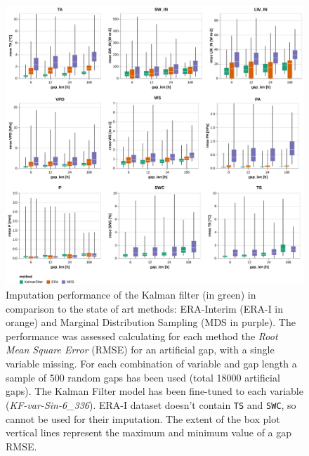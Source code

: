 \documentclass{article}
\newcommand{\imgwidth}{6in}
\begin{document}
\begin{figure}
    \centerline{\includegraphics[width=\imgwidth]{images2/the_plot}}
\caption{ Imputation performance of the Kalman filter (in green) in comparison to the state of art methods: ERA-Interim (ERA-I in orange) and Marginal Distribution Sampling (MDS in purple). The performance was assessed calculating for each method the \textit{Root Mean Square Error} (RMSE) for an artificial gap, with a single variable missing. For each combination of variable and gap length a sample of 500 random gaps has been used (total 18000 artificial gaps).
The Kalman Filter model has been fine-tuned to each variable (\textit{KF-\textlangle var\textrangle-Sin-6\_336}). ERA-I dataset doesn't contain \texttt{TS} and \texttt{SWC}, so cannot be used for their imputation. The extent of the box plot vertical lines represent the maximum and minimum value of a gap RMSE.}
\label{fig:the_plot}
\end{figure}

\newcommand{\CapTheTable}{Imputation performance of the Kalman filter in comparison to the state-of-the-art
methods: ERA-Interim (ERA-I) and Marginal Distribution Sampling (MDS), using mean and standard deviation of the \textit{Root Mean Square Error} (RMSE). The best method for each gap length is highlighted in bold.}

\end{document}
